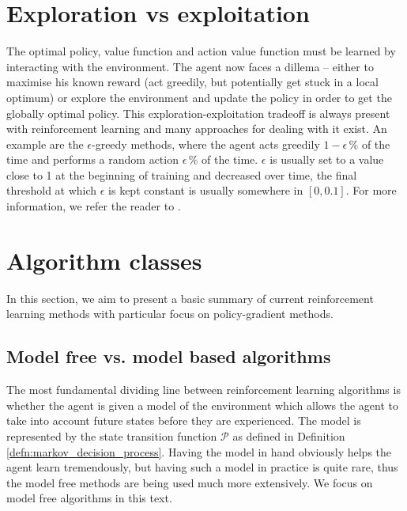 \section{Exploration vs exploitation}
\label{section:explo_vs_exploit}
The optimal policy, value function and action value function must be learned by interacting with the environment. The agent now faces a dillema -- either to maximise his known reward (act greedily, but potentially get stuck in a local optimum) or explore the environment and update the policy in order to get the globally optimal policy. This exploration-exploitation tradeoff is always present with reinforcement learning and many approaches for dealing with it exist. An example are the $\epsilon$-greedy methods, where the agent acts greedily $1-\epsilon \, \%$ of the time and performs a random action $\epsilon \, \%$ of the time. $\epsilon$ is usually set to a value close to 1 at the beginning of training and decreased over time, the final threshold at which $\epsilon$ is kept constant is usually somewhere in $[0,0.1]$. For more information, we refer the reader to \cite[Section 2.7.]{sutton2018reinforcement}.

\section{Algorithm classes}
In this section, we aim to present a basic summary of current reinforcement learning methods with particular focus on policy-gradient methods.
\subsection{Model free vs. model based algorithms}
The most fundamental dividing line between reinforcement learning algorithms is whether the agent is given a model of the environment which allows the agent to take into account future states before they are experienced. The model is represented by the state transition function $\mathcal{P}$ as defined in Definition \ref{defn:markov_decision_process}. Having the model in hand obviously helps the agent learn tremendously, but having such a model in practice is quite rare, thus the model free methods are being used much more extensively. We focus on model free algorithms in this text.

